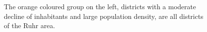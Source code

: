 \begin{figure}
  \centering
  \qquad
  \caption{
    The orange coloured group on the left, districts with a moderate decline of inhabitants and large population density, are all districts of the Ruhr area.
  }\label{fig:evaluation:cases:multiselect:1}
\end{figure}

